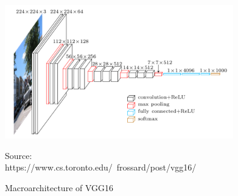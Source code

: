 \begin{figure}[h]
	\centering
	\includegraphics[height=220px]{gfx/2-Background/vgg16.png}
	\caption{Macroarchitecture of VGG16}
	\label{fig:VGG16}
	\vspace{7pt}
	\footnotesize{ 
		Source:\\
		https://www.cs.toronto.edu/~frossard/post/vgg16/
	}
\end{figure}
\vspace{1.5cm}
